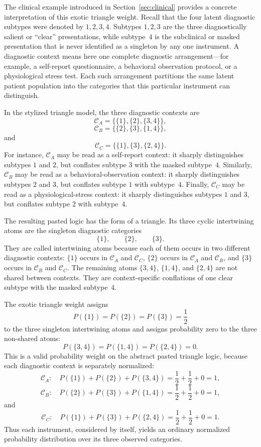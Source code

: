 \documentclass[aps,pra,twocolumn,superscriptaddress,floatfix,longbibliography]{revtex4-2}
\begin{document}
The clinical example introduced in Section~\ref{sec:clinical}
provides a concrete interpretation of this exotic triangle weight.
Recall that the four latent diagnostic subtypes were denoted by
\(1,2,3,4\). Subtypes \(1,2,3\) are the three diagnostically salient
or ``clear'' presentations, while subtype~\(4\) is the subclinical or
masked presentation that is never identified as a singleton by any
one instrument. A diagnostic context means here one complete
diagnostic arrangement---for example, a self-report questionnaire, a
behavioral observation protocol, or a physiological stress test. Each
such arrangement partitions the same latent patient population into
the categories that this particular instrument can distinguish.

In the stylized triangle model, the three diagnostic contexts are
\[
\mathcal C_A=\{\{1\},\{2\},\{3,4\}\},
\]
\[
\mathcal C_B=\{\{2\},\{3\},\{1,4\}\},
\]
and
\[
\mathcal C_C=\{\{1\},\{3\},\{2,4\}\}.
\]
For instance, \(\mathcal C_A\) may be read as a self-report context:
it sharply distinguishes subtypes \(1\) and \(2\), but conflates
subtype \(3\) with the masked subtype~\(4\). Similarly,
\(\mathcal C_B\) may be read as a behavioral-observation context:
it sharply distinguishes subtypes \(2\) and \(3\), but conflates
subtype \(1\) with subtype~\(4\). Finally, \(\mathcal C_C\) may be
read as a physiological-stress context: it sharply distinguishes
subtypes \(1\) and \(3\), but conflates subtype \(2\) with
subtype~\(4\).

The resulting pasted logic has the form of a triangle. Its three
cyclic intertwining atoms are the singleton diagnostic categories
\[
\{1\},\qquad \{2\},\qquad \{3\}.
\]
They are called intertwining atoms because each of them occurs in
two different diagnostic contexts: \(\{1\}\) occurs in
\(\mathcal C_A\) and \(\mathcal C_C\), \(\{2\}\) occurs in
\(\mathcal C_A\) and \(\mathcal C_B\), and \(\{3\}\) occurs in
\(\mathcal C_B\) and \(\mathcal C_C\). The remaining atoms
\(\{3,4\}\), \(\{1,4\}\), and \(\{2,4\}\) are not shared between
contexts. They are context-specific conflations of one clear subtype
with the masked subtype~\(4\).

The exotic triangle weight assigns
\[
P(\{1\})=P(\{2\})=P(\{3\})=\frac12
\]
to the three singleton intertwining atoms and assigns probability
zero to the three non-shared atoms:
\[
P(\{3,4\})=P(\{1,4\})=P(\{2,4\})=0.
\]
This is a valid probability weight on the abstract pasted triangle
logic, because each diagnostic context is separately normalized:
\[
\mathcal C_A:\quad
P(\{1\})+P(\{2\})+P(\{3,4\})
=
\frac12+\frac12+0=1,
\]
\[
\mathcal C_B:\quad
P(\{2\})+P(\{3\})+P(\{1,4\})
=
\frac12+\frac12+0=1,
\]
and
\[
\mathcal C_C:\quad
P(\{1\})+P(\{3\})+P(\{2,4\})
=
\frac12+\frac12+0=1.
\]
Thus each instrument, considered by itself, yields an ordinary
normalized probability distribution over its three observed
categories.
\end{document}
